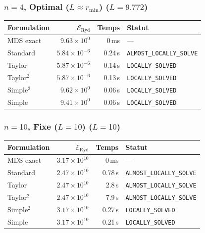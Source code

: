 \subsubsection{$n=4$, Optimal ($L{\approx}r_{\min}$) ($L=9.772$)}
\begin{longtable}{@{}lrrl@{}}
  \toprule
  Formulation & $\mathcal{E}_{\mathrm{Ryd}}$ & Temps & Statut \\
  \midrule
  \endhead
  MDS exact & $9.63\times10^{0}$ & 0\,ms & --- \\
  Standard & $5.84\times10^{-6}$ & 0.24\,s & \texttt{ALMOST\_LOCALLY\_SOLVE} \\
  Taylor & $5.87\times10^{-6}$ & 0.14\,s & \texttt{LOCALLY\_SOLVED} \\
  Taylor$^2$ & $5.87\times10^{-6}$ & 0.13\,s & \texttt{LOCALLY\_SOLVED} \\
  Simple$^2$ & $9.62\times10^{0}$ & 0.06\,s & \texttt{LOCALLY\_SOLVED} \\
  Simple & $9.41\times10^{0}$ & 0.06\,s & \texttt{LOCALLY\_SOLVED} \\
  \bottomrule
\end{longtable}

\subsubsection{$n=10$, Fixe ($L{=}10$) ($L=10$)}
\begin{longtable}{@{}lrrl@{}}
  \toprule
  Formulation & $\mathcal{E}_{\mathrm{Ryd}}$ & Temps & Statut \\
  \midrule
  \endhead
  MDS exact & $3.17\times10^{10}$ & 0\,ms & --- \\
  Standard & $2.47\times10^{10}$ & 0.78\,s & \texttt{ALMOST\_LOCALLY\_SOLVE} \\
  Taylor & $2.47\times10^{10}$ & 2.8\,s & \texttt{ALMOST\_LOCALLY\_SOLVE} \\
  Taylor$^2$ & $2.47\times10^{10}$ & 7.9\,s & \texttt{ALMOST\_LOCALLY\_SOLVE} \\
  Simple$^2$ & $3.17\times10^{10}$ & 0.27\,s & \texttt{LOCALLY\_SOLVED} \\
  Simple & $3.17\times10^{10}$ & 0.21\,s & \texttt{LOCALLY\_SOLVED} \\
  \bottomrule
\end{longtable}

